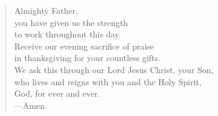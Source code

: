 \prayer

\setlength{\leftmargini}{\prayerleftmargini}

\begin{verse}
Almighty Father,\\
you have given us the strength\\
to work throughout this day.\\
Receive our evening sacrifice of praise\\
in thanksgiving for your countless gifts.\\
We ask this through our Lord Jesus Christ, your Son,\\
who lives and reigns with you and the Holy Spirit,\\
God, for ever and ever.\\
{\color{red}---\thinspace}Amen.
\end{verse}

\setlength{\leftmargini}{\defleftmargini}